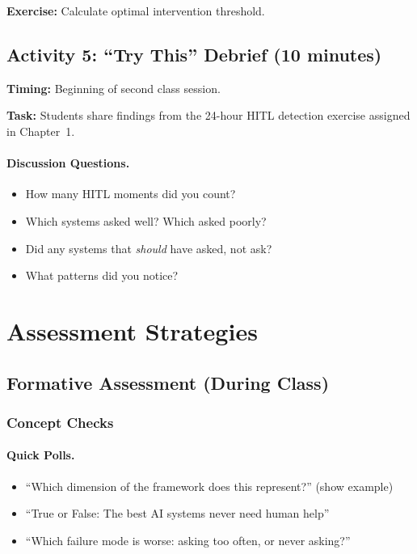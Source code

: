 \textbf{Exercise:} Calculate optimal intervention threshold.

\subsection{Activity 5: ``Try This'' Debrief (10 minutes)}

\textbf{Timing:} Beginning of second class session.

\textbf{Task:} Students share findings from the 24-hour HITL detection exercise assigned in Chapter~1.

\paragraph{Discussion Questions.}
\begin{itemize}
    \item How many HITL moments did you count?
    \item Which systems asked well? Which asked poorly?
    \item Did any systems that \emph{should} have asked, not ask?
    \item What patterns did you notice?
\end{itemize}

\section{Assessment Strategies}

\subsection{Formative Assessment (During Class)}

\subsubsection{Concept Checks}

\paragraph{Quick Polls.}
\begin{itemize}
    \item ``Which dimension of the framework does this represent?'' (show example)
    \item ``True or False: The best AI systems never need human help''
    \item ``Which failure mode is worse: asking too often, or never asking?''
\end{itemize}

